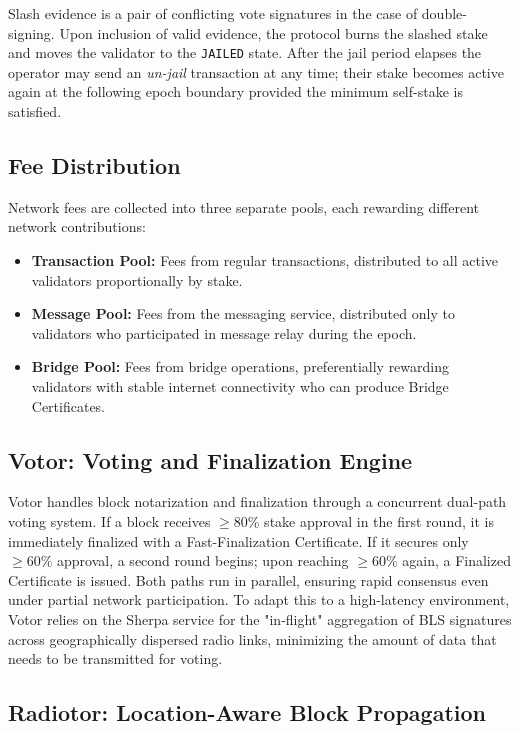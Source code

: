 \documentclass{article}
\begin{document}
Slash evidence is a pair of conflicting vote signatures in the case of double-signing. Upon inclusion of valid evidence, the protocol burns the slashed stake and moves the validator to the \texttt{JAILED} state.  After the jail period elapses the operator may send an \emph{un-jail} transaction at any time; their stake becomes active again at the following epoch boundary provided the minimum self-stake is satisfied.

\subsection{Fee Distribution}
\label{sec:fees}

Network fees are collected into three separate pools, each rewarding different network contributions:
\begin{itemize}
    \item \textbf{Transaction Pool:} Fees from regular transactions, distributed to all active validators proportionally by stake.
    \item \textbf{Message Pool:} Fees from the messaging service, distributed only to validators who participated in message relay during the epoch.
    \item \textbf{Bridge Pool:} Fees from bridge operations, preferentially rewarding validators with stable internet connectivity who can produce Bridge Certificates.
\end{itemize}

\subsection{Votor: Voting and Finalization Engine}

Votor handles block notarization and finalization through a concurrent dual-path voting system. If a block receives $\geq 80\%$ stake approval in the first round, it is immediately finalized with a Fast-Finalization Certificate. If it secures only $\geq 60\%$ approval, a second round begins; upon reaching $\geq 60\%$ again, a Finalized Certificate is issued. Both paths run in parallel, ensuring rapid consensus even under partial network participation. To adapt this to a high-latency environment, Votor relies on the Sherpa service for the "in-flight" aggregation of BLS signatures across geographically dispersed radio links, minimizing the amount of data that needs to be transmitted for voting.

\subsection{Radiotor: Location-Aware Block Propagation}
\end{document}
